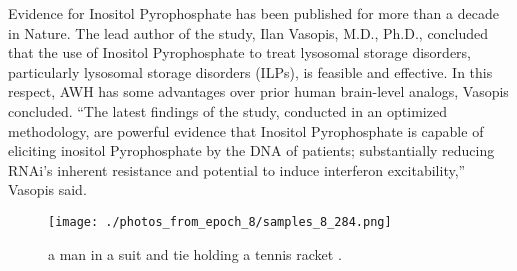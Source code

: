 \documentclass{article}%
\begin{document}
Evidence for Inositol Pyrophosphate has been published for more than a decade in Nature. The lead author of the study, Ilan Vasopis, M.D., Ph.D., concluded that the use of Inositol Pyrophosphate to treat lysosomal storage disorders, particularly lysosomal storage disorders (ILPs), is feasible and effective.\newline%
In this respect, AWH has some advantages over prior human brain{-}level analogs, Vasopis concluded. “The latest findings of the study, conducted in an optimized methodology, are powerful evidence that Inositol Pyrophosphate is capable of eliciting inositol Pyrophosphate by the DNA of patients; substantially reducing RNAi’s inherent resistance and potential to induce interferon excitability,” Vasopis said.\newline%

%


\begin{figure}[h!]%
\centering%
\texttt{[image: ./photos\_from\_epoch\_8/samples\_8\_284.png]}%
\caption{a man in a suit and tie holding a tennis racket .}%
\end{figure}

%
\end{document}
